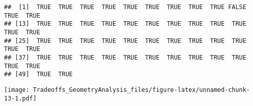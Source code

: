 \documentclass[]{article}
\begin{document}
\begin{verbatim}
##  [1]  TRUE  TRUE  TRUE  TRUE  TRUE  TRUE  TRUE  TRUE  TRUE FALSE  TRUE  TRUE
## [13]  TRUE  TRUE  TRUE  TRUE  TRUE  TRUE  TRUE  TRUE  TRUE  TRUE  TRUE  TRUE
## [25]  TRUE  TRUE  TRUE  TRUE  TRUE  TRUE  TRUE  TRUE  TRUE  TRUE  TRUE  TRUE
## [37]  TRUE  TRUE  TRUE  TRUE  TRUE  TRUE  TRUE  TRUE  TRUE  TRUE  TRUE  TRUE
## [49]  TRUE  TRUE
\end{verbatim}

\texttt{[image: Tradeoffs\_GeometryAnalysis\_files/figure-latex/unnamed-chunk-13-1.pdf]}
\end{document}
